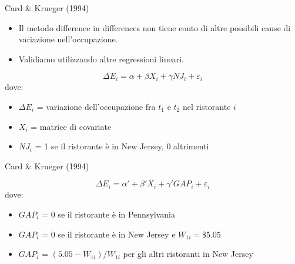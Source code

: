 \documentclass[
  ignorenonframetext,
]{beamer}
\providecommand{\tightlist}{%
  \setlength{\itemsep}{0pt}\setlength{\parskip}{0pt}}
\begin{document}
\begin{frame}{Card \& Krueger (1994)}
\protect\hypertarget{card-krueger-1994}{}

\begin{itemize}
\item
  Il metodo difference in differences non tiene conto di altre possibili
  cause di variazione nell'occupazione.
\item
  Validiamo utilizzando altre regressioni lineari.
\end{itemize}

\[
\Delta E_i = \alpha + \beta X_i + \gamma NJ_i + \varepsilon_i
\] dove:

\begin{itemize}
\tightlist
\item
  \(\Delta E_i\) = variazione dell'occupazione fra \(t_1\) e \(t_2\) nel
  ristorante \(i\)
\item
  \(X_i\) = matrice di covariate
\item
  \(NJ_i\) = 1 se il ristorante è in New Jersey, 0 altrimenti
\end{itemize}

\end{frame}

\begin{frame}{Card \& Krueger (1994)}
\protect\hypertarget{card-krueger-1994-1}{}

\[
\Delta E_i = \alpha' + \beta' X_i + \gamma' GAP_i + \varepsilon_i
\] dove:

\begin{itemize}
\tightlist
\item
  \(GAP_i\) = 0 se il ristorante è in Pennsylvania
\item
  \(GAP_i\) = 0 se il ristorante è in New Jersey e \(W_{1i} = \$5.05\)
\item
  \(GAP_i\) = \((5.05 - W_{1i})/W_{1i}\) per gli altri ristoranti in New
  Jersey
\end{itemize}

\end{frame}
\end{document}
